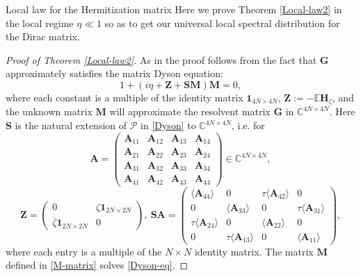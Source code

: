 \documentclass[11pt, a4paper, oneside]{book}
\numberwithin{equation}{chapter}
\newcommand{\E}{\mathbb E}
\newcommand{\beq}{\begin{equation}}
\newcommand{\eeq}{\end{equation}}
\begin{document}
\begin{section}{Local law for the Hermitization matrix}
Here we prove Theorem \ref{Local-law2} in the local regime $\eta \ll 1$ so as to get our universal local spectral distribution for the Dirac matrix.
%
\begin{proof}[Proof of Theorem \ref{Local-law2}] As in \cite{alt2022local} the proof follows from the fact that $\mathbf{G}$ approximately satisfies the matrix Dyson equation:
%
\beq \label{Dyson-eq}
1 + ( i\eta + \mathbf{Z} + \bm{S} \mathbf{M} ) \mathbf{M} = 0,
\eeq
%
where each constant is a multiple of the identity matrix $\boldsymbol{1}_{4N \times 4N}$, $\mathbf{Z} := - \E \mathbf{H}_{\zeta} $, and the unknown matrix $\mathbf{M}$ will approximate the resolvent matrix $\mathbf{G}$ in $\mathbb{C}^{4N \times 4N}.$ Here $\bm{S}$ is the natural extension of $\mathscr{P}$ in \eqref{Dyson} to $\mathbb{C}^{4N \times 4N}$, i.e. for
%
\begin{equation}
\mathbf{A} = \begin{pmatrix} \mathbf{A}_{11}& \mathbf{A}_{12} & \mathbf{A}_{13} & \mathbf{A}_{14} \\
\mathbf{A}_{21}& \mathbf{A}_{22} & \mathbf{A}_{23} & \mathbf{A}_{24} \\
\mathbf{A}_{31}& \mathbf{A}_{32} & \mathbf{A}_{33} & \mathbf{A}_{34} \\
\mathbf{A}_{41}& \mathbf{A}_{42} & \mathbf{A}_{43} & \mathbf{A}_{44} 
\end{pmatrix} \in \mathbb{C}^{4N \times 4N} ,
\end{equation}
%
\beq \label{dyson-comp}
\mathbf{Z} = \begin{pmatrix} 0  & \zeta \boldsymbol{1}_{2N \times 2N} \\ \overline{\zeta} \boldsymbol{1}_{2N \times 2N} & 0  \end{pmatrix} , \  \bm{S} \mathbf{A} = \begin{pmatrix} \langle \mathbf{A}_{44} \rangle  & 0 & \tau \langle \mathbf{A}_{42} \rangle  & 0 \\ 0 & \langle \mathbf{A}_{33}\rangle  & 0 & \tau \langle \mathbf{A}_{31} \rangle  \\ \tau \langle \mathbf{A}_{24} \rangle  & 0 & \langle \mathbf{A}_{22} \rangle   & 0 \\ 0 & \tau \langle \mathbf{A}_{13} \rangle  & 0 & \langle \mathbf{A}_{11} \rangle  \end{pmatrix} ,
\eeq
%
where each entry is a multiple of the $N \times N$ identity matrix. The matrix $\mathbf{M}$ defined in \eqref{M-matrix} solves \eqref{Dyson-eq}.


\end{proof}
\end{section}
\end{document}
